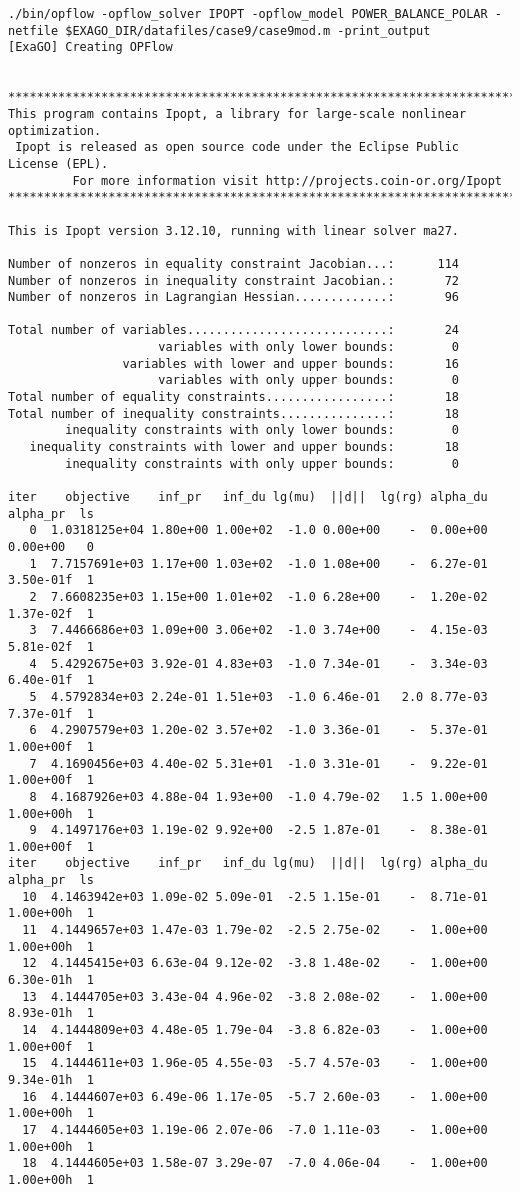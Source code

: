\begin{lstlisting}
./bin/opflow -opflow_solver IPOPT -opflow_model POWER_BALANCE_POLAR -netfile $EXAGO_DIR/datafiles/case9/case9mod.m -print_output
[ExaGO] Creating OPFlow


******************************************************************************
This program contains Ipopt, a library for large-scale nonlinear optimization.
 Ipopt is released as open source code under the Eclipse Public License (EPL).
         For more information visit http://projects.coin-or.org/Ipopt
******************************************************************************

This is Ipopt version 3.12.10, running with linear solver ma27.

Number of nonzeros in equality constraint Jacobian...:      114
Number of nonzeros in inequality constraint Jacobian.:       72
Number of nonzeros in Lagrangian Hessian.............:       96

Total number of variables............................:       24
                     variables with only lower bounds:        0
                variables with lower and upper bounds:       16
                     variables with only upper bounds:        0
Total number of equality constraints.................:       18
Total number of inequality constraints...............:       18
        inequality constraints with only lower bounds:        0
   inequality constraints with lower and upper bounds:       18
        inequality constraints with only upper bounds:        0

iter    objective    inf_pr   inf_du lg(mu)  ||d||  lg(rg) alpha_du alpha_pr  ls
   0  1.0318125e+04 1.80e+00 1.00e+02  -1.0 0.00e+00    -  0.00e+00 0.00e+00   0
   1  7.7157691e+03 1.17e+00 1.03e+02  -1.0 1.08e+00    -  6.27e-01 3.50e-01f  1
   2  7.6608235e+03 1.15e+00 1.01e+02  -1.0 6.28e+00    -  1.20e-02 1.37e-02f  1
   3  7.4466686e+03 1.09e+00 3.06e+02  -1.0 3.74e+00    -  4.15e-03 5.81e-02f  1
   4  5.4292675e+03 3.92e-01 4.83e+03  -1.0 7.34e-01    -  3.34e-03 6.40e-01f  1
   5  4.5792834e+03 2.24e-01 1.51e+03  -1.0 6.46e-01   2.0 8.77e-03 7.37e-01f  1
   6  4.2907579e+03 1.20e-02 3.57e+02  -1.0 3.36e-01    -  5.37e-01 1.00e+00f  1
   7  4.1690456e+03 4.40e-02 5.31e+01  -1.0 3.31e-01    -  9.22e-01 1.00e+00f  1
   8  4.1687926e+03 4.88e-04 1.93e+00  -1.0 4.79e-02   1.5 1.00e+00 1.00e+00h  1
   9  4.1497176e+03 1.19e-02 9.92e+00  -2.5 1.87e-01    -  8.38e-01 1.00e+00f  1
iter    objective    inf_pr   inf_du lg(mu)  ||d||  lg(rg) alpha_du alpha_pr  ls
  10  4.1463942e+03 1.09e-02 5.09e-01  -2.5 1.15e-01    -  8.71e-01 1.00e+00h  1
  11  4.1449657e+03 1.47e-03 1.79e-02  -2.5 2.75e-02    -  1.00e+00 1.00e+00h  1
  12  4.1445415e+03 6.63e-04 9.12e-02  -3.8 1.48e-02    -  1.00e+00 6.30e-01h  1
  13  4.1444705e+03 3.43e-04 4.96e-02  -3.8 2.08e-02    -  1.00e+00 8.93e-01h  1
  14  4.1444809e+03 4.48e-05 1.79e-04  -3.8 6.82e-03    -  1.00e+00 1.00e+00f  1
  15  4.1444611e+03 1.96e-05 4.55e-03  -5.7 4.57e-03    -  1.00e+00 9.34e-01h  1
  16  4.1444607e+03 6.49e-06 1.17e-05  -5.7 2.60e-03    -  1.00e+00 1.00e+00h  1
  17  4.1444605e+03 1.19e-06 2.07e-06  -7.0 1.11e-03    -  1.00e+00 1.00e+00h  1
  18  4.1444605e+03 1.58e-07 3.29e-07  -7.0 4.06e-04    -  1.00e+00 1.00e+00h  1


\end{lstlisting}
